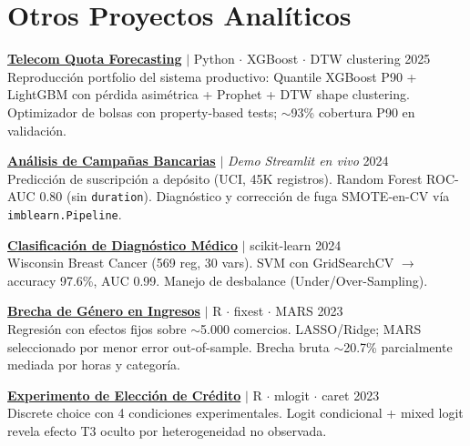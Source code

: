 \documentclass[a4paper,10pt]{article}
\newcommand{\sectionspace}{\vspace{0.15cm}}
\newcommand{\minispace}{\vspace{0.05cm}}
\begin{document}
\sectionspace

\section*{Otros Proyectos Analíticos}

\noindent\textbf{\href{https://github.com/jsanchez-ds/telecom-quota-forecasting}{Telecom Quota Forecasting}} $|$ Python $\cdot$ XGBoost $\cdot$ DTW clustering \hfill 2025 \\
Reproducción portfolio del sistema productivo: Quantile XGBoost P90 + LightGBM con pérdida asimétrica + Prophet + DTW shape clustering. Optimizador de bolsas con property-based tests; $\sim$93\% cobertura P90 en validación.

\minispace

\noindent\textbf{\href{https://bank-marketing-analysis-jsanchez.streamlit.app/}{Análisis de Campañas Bancarias}} $|$ \textit{Demo Streamlit en vivo} \hfill 2024 \\
Predicción de suscripción a depósito (UCI, 45K registros). Random Forest ROC-AUC 0.80 (sin \texttt{duration}). Diagnóstico y corrección de fuga SMOTE-en-CV vía \texttt{imblearn.Pipeline}.

\minispace

\noindent\textbf{\href{https://jsanchez-ds.github.io/medical-diagnosis-classification/}{Clasificación de Diagnóstico Médico}} $|$ scikit-learn \hfill 2024 \\
Wisconsin Breast Cancer (569 reg, 30 vars). SVM con GridSearchCV $\to$ accuracy 97.6\%, AUC 0.99. Manejo de desbalance (Under/Over-Sampling).

\minispace

\noindent\textbf{\href{https://jsanchez-ds.github.io/gender-income-gap/}{Brecha de Género en Ingresos}} $|$ R $\cdot$ fixest $\cdot$ MARS \hfill 2023 \\
Regresión con efectos fijos sobre $\sim$5.000 comercios. LASSO/Ridge; MARS seleccionado por menor error out-of-sample. Brecha bruta $\sim$20.7\% parcialmente mediada por horas y categoría.

\minispace

\noindent\textbf{\href{https://jsanchez-ds.github.io/credit-choice-experiment/}{Experimento de Elección de Crédito}} $|$ R $\cdot$ mlogit $\cdot$ caret \hfill 2023 \\
Discrete choice con 4 condiciones experimentales. Logit condicional + mixed logit revela efecto T3 oculto por heterogeneidad no observada.
\end{document}
